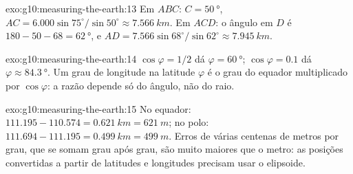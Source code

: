 \begin{solution}{exo:g10:measuring-the-earth:13}
Em $ABC$: $C = \qty{50}{\degree}$, $AC = 6.000 \sin 75^\circ/\sin 50^\circ
\approx \qty{7.566}{km}$. Em $ACD$: o ângulo em $D$ é $180 - 50 - 68 =
\qty{62}{\degree}$, e $AD = 7.566 \sin 68^\circ/\sin 62^\circ \approx
\qty{7.945}{km}$.
\end{solution}

\begin{solution}{exo:g10:measuring-the-earth:14}
$\cos\varphi = 1/2$ dá $\varphi = \qty{60}{\degree}$; $\cos\varphi = 0.1$
dá $\varphi \approx \qty{84.3}{\degree}$. Um grau de longitude na latitude
$\varphi$ é o grau do equador multiplicado por $\cos\varphi$: a razão
depende só do ângulo, não do raio.
\end{solution}

\begin{solution}{exo:g10:measuring-the-earth:15}
No equador: $111.195 - 110.574 = \qty{0.621}{km} = \qty{621}{m}$; no polo:
$111.694 - 111.195 = \qty{0.499}{km} = \qty{499}{m}$. Erros de várias
centenas de metros por grau, que se somam grau após grau, são muito maiores
que o metro: as posições convertidas a partir de latitudes e longitudes
precisam usar o elipsoide.
\end{solution}

